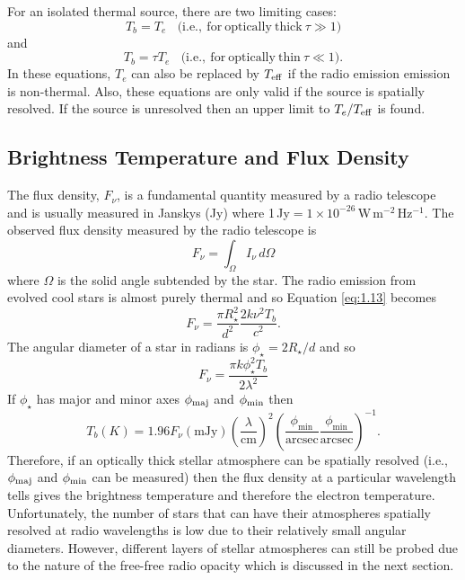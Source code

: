 For an isolated thermal source, there are two limiting cases:
\begin{equation}\label{eq:1.11}
T_{b} = T_{e} \ \ \ \ \mathrm{(i.e.,\ for\ optically\ thick}\ \tau \gg 1)
\end{equation}
and
\begin{equation}\label{eq:1.12}
T_{b} = \tau T_{e} \ \ \ \ \mathrm{(i.e.,\ for\ optically\ thin}\ \tau \ll 1).
\end{equation}
In these equations, $T_{e}$ can also be replaced by $T_{\rm{eff}}$ if the radio emission emission is non-thermal. Also, these equations are only valid if the source is spatially resolved. If the source is unresolved then an upper limit to $T_{e}/T_{\rm{eff}}$ is found.

\subsection{Brightness Temperature and Flux Density}\label{subsec:3.1.2}
The flux density, $F_{\nu}$, is a fundamental quantity measured by a radio telescope and is usually measured in Janskys (Jy) where 1\,Jy$ = 1\times 10^{-26}$\,W\,m$^{-2}$\,Hz$^{-1}$. The observed flux density measured by the radio telescope is
\begin{equation}\label{eq:1.13}
F_{\nu} = \int _{\Omega} I_{\nu}\,d\Omega
\end{equation}
where $\Omega$ is the solid angle subtended by the star. The radio emission from evolved cool stars is almost purely thermal and so Equation \ref{eq:1.13} becomes 
\begin{equation}
F_{\nu} =  \frac{\pi R_{\star}^2}{d^2}\frac{2k\nu ^2T_{b}}{c^2}.
\end{equation}
The angular diameter of a star in radians is $\phi _{\star}=2R_{\star}/d$ and so
\begin{equation}
F_{\nu}=\frac{\pi k\phi _{\star}^2 T_b}{2\lambda ^2}
\end{equation}
If $\phi _{\star}$ has major and minor axes $\phi _{\rm{maj}}$ and $\phi _{\rm{min}}$ then
\begin{equation}
T_{b} (K)=1.96F_{\nu}(\mathrm{mJy})\left(\frac{\lambda}{\mathrm{cm}}\right)^2\left(\frac{\phi _{\mathrm{min}}}{\mathrm{arcsec}} \frac{\phi _{\mathrm{min}}}{\mathrm{arcsec}}\right)^{-1}.
\end{equation}
Therefore, if an optically thick stellar atmosphere can be spatially resolved (i.e., $\phi _{\rm{maj}}$ and $\phi _{\rm{min}}$ can be measured) then the flux density at a particular wavelength tells gives the brightness temperature and therefore the electron temperature. Unfortunately, the number of stars that can have their atmospheres spatially resolved at radio wavelengths is low due to their relatively small angular diameters. However, different layers of stellar atmospheres can still be probed due to the nature of the free-free radio opacity which is discussed in the next section.

